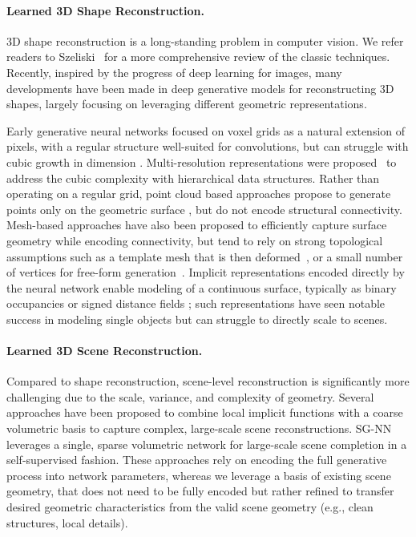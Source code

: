 
\paragraph{Learned 3D Shape Reconstruction.} 
3D shape reconstruction is a long-standing problem in computer vision. 
We refer readers to Szeliski~\cite{szeliski2010computer} for a more comprehensive review of the classic techniques. 
Recently, inspired by the progress of deep learning for images, many developments have been made in deep generative models for reconstructing 3D shapes, largely focusing on leveraging different geometric representations.

Early generative neural networks focused on voxel grids as a natural extension of pixels, with a regular structure well-suited for convolutions, but can struggle with cubic growth in dimension \cite{maturana2015voxnet,wu20153d,choy20163d,dai2017shape}.
Multi-resolution representations were proposed~\cite{hane2017hierarchical, tatarchenko2017octree} to address the cubic complexity with hierarchical data structures.
%
Rather than operating on a regular grid, point cloud based approaches propose to generate points only on the geometric surface \cite{fan2017point,yang2019pointflow}, but do not encode structural connectivity. 
%
Mesh-based approaches have also been proposed to efficiently capture surface geometry while encoding connectivity, but tend to rely on strong topological assumptions such as a template mesh that is then deformed~\cite{wang2018pixel2mesh}, or a small number of vertices for free-form generation~\cite{dai2019scan2mesh}.
%
Implicit representations encoded directly by the neural network enable modeling of a continuous surface, typically as binary occupancies or signed distance fields \cite{mescheder2019occupancy,deepsdf,chibane2020implicit}; such representations have seen notable success in modeling single objects but can struggle to directly scale to scenes.

\paragraph{Learned 3D Scene Reconstruction.} 
Compared to shape reconstruction, scene-level reconstruction is significantly more challenging due to the scale, variance, and complexity of geometry. 
Several approaches have been proposed to combine local implicit functions with a coarse volumetric basis \cite{jiang2020local,deep_local_shapes,peng2020convolutional} to capture complex, large-scale scene reconstructions.
SG-NN~\cite{dai2020sg} leverages a single, sparse volumetric network for large-scale scene completion in a self-supervised fashion. These approaches rely on encoding the full generative process into network parameters, whereas we leverage a basis of existing scene geometry, that does not need to be fully encoded but rather refined to transfer desired geometric characteristics from the valid scene geometry (e.g., clean structures, local details). 


